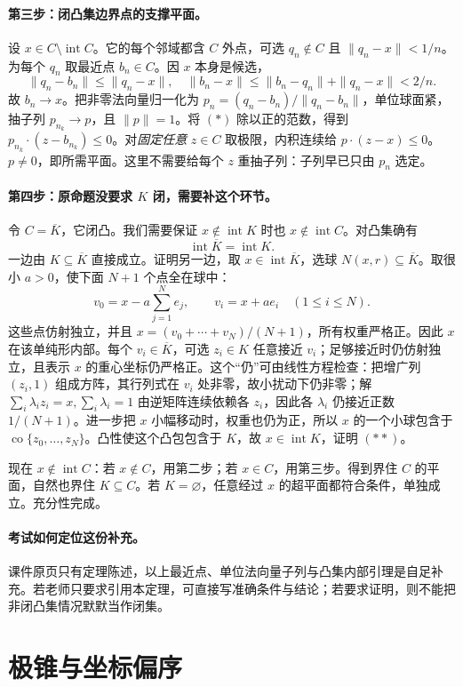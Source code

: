 \documentclass[11pt,a4paper]{article}
\DeclareMathOperator{\conv}{co}\DeclareMathOperator{\cl}{cl}
\DeclareMathOperator{\Int}{int}\DeclareMathOperator{\diam}{diam}
\theoremstyle{definition}\newtheorem{definition}{定义}\newtheorem{example}{例}
\begin{document}
\paragraph{第三步：闭凸集边界点的支撑平面。}
设 $x\in C\setminus\Int C$。它的每个邻域都含 $C$ 外点，可选 $q_n\notin C$ 且 $\|q_n-x\|<1/n$。为每个 $q_n$ 取最近点 $b_n\in C$。因 $x$ 本身是候选，
\[\|q_n-b_n\|\le\|q_n-x\|,
\quad\|b_n-x\|\le\|b_n-q_n\|+\|q_n-x\|<2/n.
\]
故 $b_n\to x$。把非零法向量归一化为 $p_n=(q_n-b_n)/\|q_n-b_n\|$，单位球面紧，抽子列 $p_{n_k}\to p$，且 $\|p\|=1$。将 $(*)$ 除以正的范数，得到 $p_{n_k}\cdot(z-b_{n_k})\le0$。对\emph{固定任意} $z\in C$ 取极限，内积连续给 $p\cdot(z-x)\le0$。$p\ne0$，即所需平面。这里不需要给每个 $z$ 重抽子列：子列早已只由 $p_n$ 选定。

\paragraph{第四步：原命题没要求 $K$ 闭，需要补这个环节。}
令 $C=\overline K$，它闭凸。我们需要保证 $x\notin\Int K$ 时也 $x\notin\Int C$。对凸集确有
\[\Int\overline K=\Int K.\tag{**}
\]
一边由 $K\subseteq\overline K$ 直接成立。证明另一边，取 $x\in\Int\overline K$，选球 $N(x,r)\subseteq\overline K$。取很小 $a>0$，使下面 $N+1$ 个点全在球中：
\[v_0=x-a\sum_{j=1}^Ne_j,\qquad v_i=x+ae_i\quad(1\le i\le N).
\]
这些点仿射独立，并且 $x=(v_0+\cdots+v_N)/(N+1)$，所有权重严格正。因此 $x$ 在该单纯形内部。每个 $v_i\in\overline K$，可选 $z_i\in K$ 任意接近 $v_i$；足够接近时仍仿射独立，且表示 $x$ 的重心坐标仍严格正。这个“仍”可由线性方程检查：把增广列 $(z_i,1)$ 组成方阵，其行列式在 $v_i$ 处非零，故小扰动下仍非零；解 $\sum_i\lambda_i z_i=x,\sum_i\lambda_i=1$ 由逆矩阵连续依赖各 $z_i$，因此各 $\lambda_i$ 仍接近正数 $1/(N+1)$。进一步把 $x$ 小幅移动时，权重也仍为正，所以 $x$ 的一个小球包含于 $\conv\{z_0,\ldots,z_N\}$。凸性使这个凸包包含于 $K$，故 $x\in\Int K$，证明 $(**)$。

现在 $x\notin\Int C$：若 $x\notin C$，用第二步；若 $x\in C$，用第三步。得到界住 $C$ 的平面，自然也界住 $K\subseteq C$。若 $K=\varnothing$，任意经过 $x$ 的超平面都符合条件，单独成立。充分性完成。

\paragraph{考试如何定位这份补充。}
课件原页只有定理陈述，以上最近点、单位法向量子列与凸集内部引理是自足补充。若老师只要求引用本定理，可直接写准确条件与结论；若要求证明，则不能把非闭凸集情况默默当作闭集。


\clearpage\section{极锥与坐标偏序}\label{g:109:65}
\end{document}
